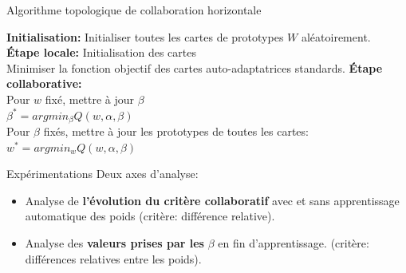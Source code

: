 \documentclass[hyperref={pdfpagelabels=false}]{beamer}
\begin{document}
    \begin{frame}
        \begin{algorithm}[H]
            \caption{Algorithme topologique de collaboration horizontale}
            \textbf{Initialisation:} Initialiser toutes les cartes de
            prototypes $W$ aléatoirement. \\
            \textbf{Étape locale:} Initialisation des cartes\\
             {
                Minimiser la fonction objectif des cartes auto-adaptatrices
                standards.
            } 
            \textbf{Étape collaborative:}\\
             {
                Pour $w$ fixé, mettre à jour $\beta$\\
                $ \beta^{*} =  argmin_{\beta}Q(w,\alpha,\beta) $\\
                Pour $\beta$ fixés, mettre à jour les prototypes de 
                toutes les cartes:\\
                $ w^{*} =  argmin_{w}Q(w,\alpha,\beta) $
            }	 
        \end{algorithm}
    \end{frame}

    \begin{frame}{Expérimentations}
        Deux axes d'analyse:
        \begin{itemize}
            \item Analyse de \textbf{l'évolution du critère collaboratif} avec 
                et sans apprentissage automatique des poids (critère: différence 
                relative).
            \item Analyse des \textbf{valeurs prises par les} $\beta$ en fin 
                d'apprentissage. (critère: différences relatives entre les 
                poids).
        \end{itemize}


    \end{frame}
\end{document}
